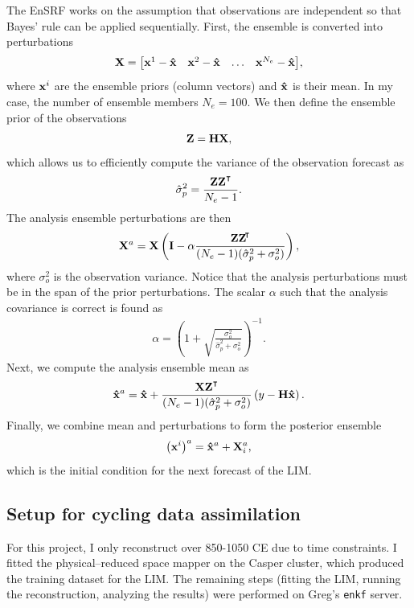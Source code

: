 \documentclass[parskip=half,DIV=16]{scrartcl}
\begin{document}
The \gls{EnSRF} works on the assumption that observations are independent so that Bayes' rule can be applied sequentially. First, the ensemble is converted into perturbations
\begin{align*}
    \vb{X} = \mqty[ \vb{x}^{1} - \vu{x} &  \vb{x}^{2} - \vu{x} & \ldots &  \vb{x}^{N_e} - \vu{x} ],
\end{align*}
where $\vb{x}^i$ are the ensemble priors (column vectors) and $\vu{x}$ is their mean. In my case, the number of ensemble members $N_e = 100$. We then define the ensemble prior of the observations
\begin{align*}
    \vb{Z} = \vb{H} \vb{X},
\end{align*}
which allows us to efficiently compute the variance of the observation forecast as
\begin{align*}
    \hat{\sigma}_p^2 = \frac{\vb{Z} \vb{Z}^\transpose}{N_e-1}.
\end{align*}
The analysis ensemble perturbations are then
\begin{align*}
    \vb{X}^a = \vb{X} \left( \vb{I} - \alpha \frac{\vb{Z} \vb{Z}^\transpose*}{(N_e-1)(\hat{\sigma}_p^2 + \sigma_o^2)} \right),
\end{align*}
where $\sigma_o^2$ is the observation variance. Notice that the analysis perturbations must be in the span of the prior perturbations. The scalar $\alpha$ such that the analysis covariance is correct is found as
\begin{align*}
    \alpha = \left( 1 + \sqrt{\frac{\sigma_o^2}{\hat{\sigma}_p^2 + \sigma_o^2}} \right)^{-1}.
\end{align*}
Next, we compute the analysis ensemble mean as
\begin{align*}
    \vu{x}^a = \vu{x} + \frac{\vb{X}\vb{Z}^\transpose}{(N_e-1)(\hat{\sigma}_p^2 + \sigma_o^2)} \left( y - \vb{H} \vu{x} \right).
\end{align*}
Finally, we combine mean and perturbations to form the posterior ensemble
\begin{align*}
    \left(\vb{x}^i\right)^a = \vu{x}^a + \vb{X}^a_i,
\end{align*}
which is the initial condition for the next forecast of the \gls{LIM}.




\subsection{Setup for cycling data assimilation}

For this project, I only reconstruct over 850-1050 CE due to time constraints. I fitted the physical--reduced space mapper on the Casper cluster, which produced the training dataset for the \gls{LIM}. The remaining steps (fitting the \gls{LIM}, running the reconstruction, analyzing the results) were performed on Greg's \texttt{enkf} server.
\end{document}
